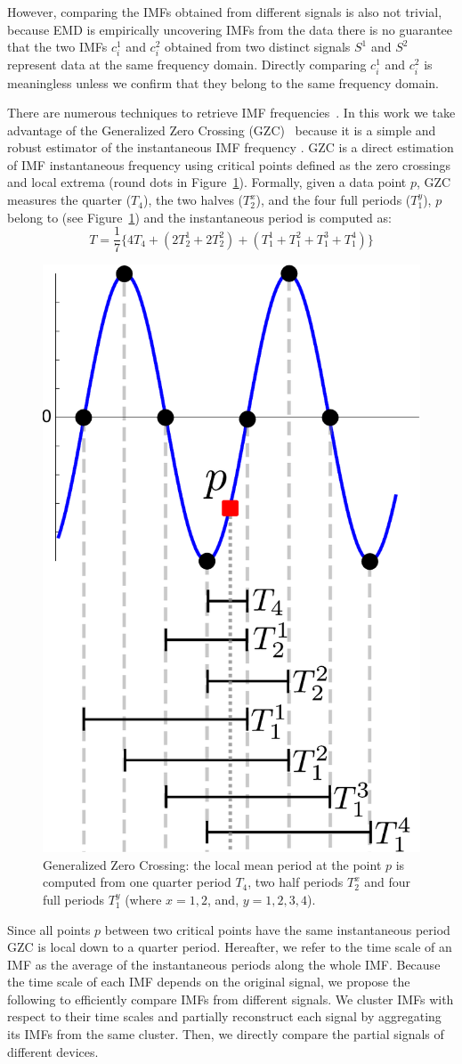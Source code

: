 However, comparing the IMFs obtained from different signals is also not trivial,
 because EMD is empirically uncovering IMFs from the data there is no guarantee that the two IMFs $c_i^1$ and $c_i^2$ obtained from two distinct signals $S^1$ and $S^2$ represent data at the same frequency domain.
Directly comparing $c_i^1$ and $c_i^2$ is meaningless unless we confirm that they belong to the same frequency domain.

There are numerous techniques to retrieve IMF frequencies~\cite{huang:aada2009}.  
In this work we take advantage of the Generalized Zero Crossing (GZC)~\cite{huang:patent2006} because it is a simple and robust 
estimator of the instantaneous IMF frequency \cite{huang:aada2009}.
GZC is a direct estimation of IMF instantaneous frequency using critical points defined as the zero crossings and local extrema 
(round dots in Figure~\ref{fig:gzc}).
Formally, given a data point $p$, GZC measures the quarter ($T_4$), the two halves ($T_2^x$), and the four full periods ($T_1^y$), $p$   
belong to (see Figure~\ref{fig:gzc}) and the instantaneous period is computed as:
\[T=\frac{1}{7}\{4T_4+(2T_2^1+2T_2^2)+(T_1^1+T_1^2+T_1^3+T_1^4)\}\]

\begin{figure}
\begin{center}
 \includegraphics[width=.25\textwidth]{figs/gzc.pdf}
 \end{center}
 \caption{Generalized Zero Crossing: the local mean period at the point $p$ is computed from one quarter period $T_4$, two half periods $T_2^x$ and four full periods $T_1^y$ (where $x=1, 2$, and, $y=1,2,3,4$).}
 \label{fig:gzc}
\end{figure}

Since all points $p$ between two critical points have the same instantaneous period GZC is local down to a quarter period.
Hereafter, we refer to the time scale of an IMF as the average of the instantaneous periods along the whole IMF.
Because the time scale of each IMF depends on the original signal, we propose the following to efficiently compare IMFs from different signals.
We cluster IMFs with respect to their time scales and partially reconstruct each signal by aggregating its IMFs from the 
same cluster.  Then, we directly compare the partial signals of different devices.


